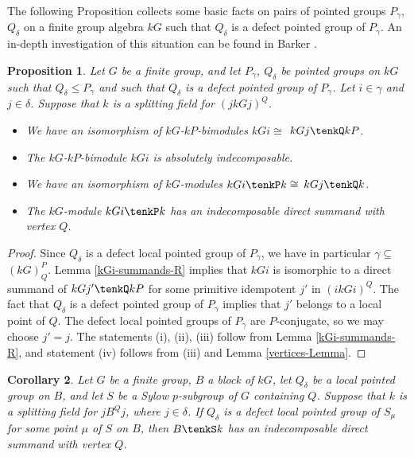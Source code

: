\documentclass{amsart}
\theoremstyle{plain}\newtheorem{Theorem}{Theorem}[section]
\theoremstyle{plain}\newtheorem{Conjecture}[Theorem]{Conjecture}
\theoremstyle{plain}\newtheorem{Corollary}[Theorem]{Corollary}
\theoremstyle{plain}\newtheorem{Lemma}[Theorem]{Lemma}
\theoremstyle{plain}\newtheorem{Proposition}[Theorem]{Proposition}
\theoremstyle{definition}\newtheorem{Definition}[Theorem]{Definition}
\theoremstyle{definition}\newtheorem{Example}[Theorem]{Example}
\theoremstyle{definition}\newtheorem{Examples}[Theorem]{Examples}
\theoremstyle{definition}\newtheorem{Exercise}[Theorem]{Exercise}
\theoremstyle{definition}\newtheorem{Notation}[Theorem]{Notation}
\theoremstyle{definition}\newtheorem{Remark}[Theorem]{Remark}
\theoremstyle{definition}\newtheorem{Remarks}[Theorem]{Remarks}
\theoremstyle{plain}\newtheorem{Statement}[Theorem]{}
\begin{document}
The following Proposition collects some basic facts on pairs of pointed groups 
$P_\gamma$, $Q_\delta$ on a finite group algebra $kG$ such that $Q_\delta$ 
is a defect pointed  group of $P_\gamma$. An in-depth investigation of this 
situation can be found in  Barker \cite{Barker25}.

\begin{Proposition} \label{kGi-summands-Prop}
Let $G$ be a finite group, and let $P_\gamma$, $Q_\delta$ be pointed groups
on $kG$ such that $Q_\delta\leq P_\gamma$ and such that $Q_\delta$ is
a defect pointed group of $P_\gamma$. Let $i\in \gamma$ and $j\in \delta$.
Suppose that $k$ is a splitting field for  $(jkGj)^Q$.
\begin{itemize}
\item[{\rm (i)}]
We have  an isomorphism of $kG$-$kP$-bimodules $kGi\cong$ $kGj\tenkQ kP$.
\item[{\rm (ii)}] 
The $kG$-$kP$-bimodule $kGi$ is absolutely indecomposable.
\item[{\rm (iii)}] 
We have an isomorphism of $kG$-modules $kGi\tenkP k\cong$ $kGj\tenkQ k$.
\item[{\rm (iv)}]
The $kG$-module $kGi\tenkP k$ has an indecomposable direct summand with
vertex $Q$.
\end{itemize}
\end{Proposition}

\begin{proof}
Since $Q_\delta$ is a defect local pointed group of $P_\gamma$, we have
in particular $\gamma\subseteq$ $(kG)^P_Q$.  Lemma \ref{kGi-summands-R}
implies that $kGi$ is isomorphic to a direct summand of $kGj'\tenkQ  kP$  for
some primitive idempotent $j'$ in $(ikGi)^Q$.
The fact that $Q_\delta$ is a defect pointed group of $P_\gamma$ implies that 
$j'$ belongs to a local point of $Q$. The defect local
pointed groups of $P_\gamma$ are $P$-conjugate, so we may choose $j'=j$.
The statements (i), (ii), (iii)  follow from Lemma \ref{kGi-summands-R},
and statement (iv) follows from (iii) and  Lemma \ref{vertices-Lemma}.
\end{proof}


\begin{Corollary} \label{vertices-on-BS}
Let $G$ be a finite group, $B$ a block of $kG$, let $Q_\delta$ be a local pointed
group on $B$, and let $S$ be a Sylow $p$-subgroup of $G$ containing $Q$.
Suppose that $k$ is a splitting field for $jB^Qj$, where $j\in \delta$.
If $Q_\delta$ is a defect local pointed group of $S_\mu$ for some point $\mu$ 
of $S$ on $B$, then $B\tenkS k$ has an indecomposable direct summand with 
vertex $Q$.
\end{Corollary}
\end{document}
